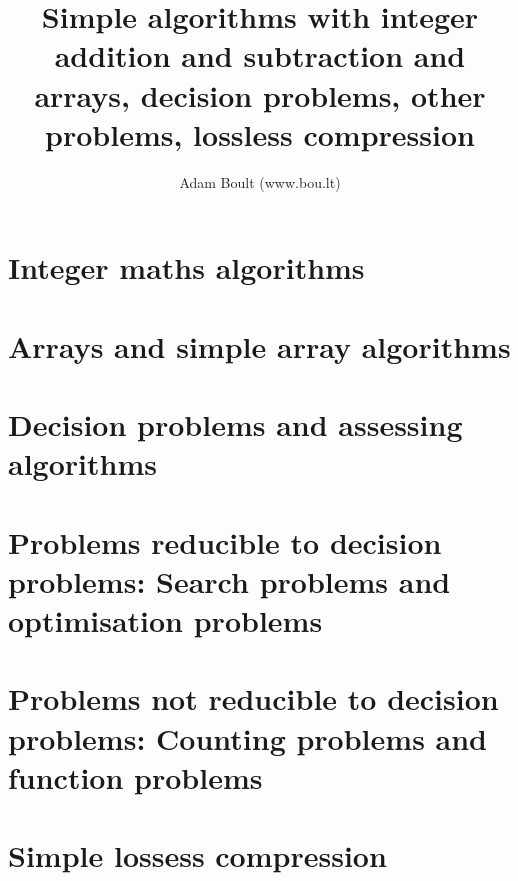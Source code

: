 \documentclass[oneside]{book}
\begin{document}
\author{Adam Boult (www.bou.lt)}
\title{Simple algorithms with integer addition and subtraction and arrays, decision problems, other problems, lossless compression}
\maketitle

\setcounter{tocdepth}{0}
\tableofcontents



\part{Integer maths algorithms}






\part{Arrays and simple array algorithms}











\part{Decision problems and assessing algorithms}








\part{Problems reducible to decision problems: Search problems and optimisation problems}



\part{Problems not reducible to decision problems: Counting problems and function problems}





\part{Simple lossess compression}

\end{document}
